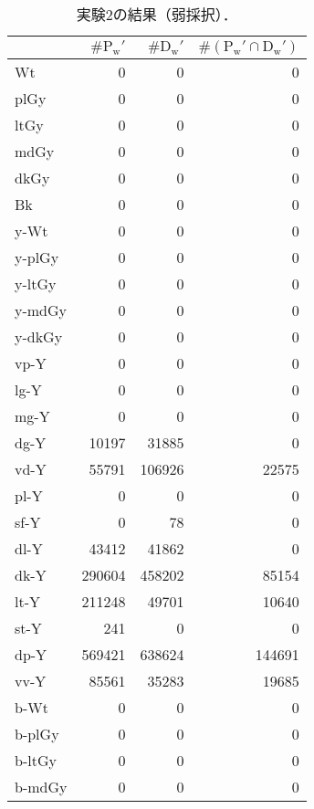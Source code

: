 \documentclass[uplatex,paper=a4,fontsize=4.0truemm,jafontsize=4.0truemm,head_space=30.0truemm,foot_space=30.0truemm,baselineskip=8.0truemm,line_length=40zw,gutter=25.0truemm,oneside,openany,fleqn,hanging_panctuation,open_bracket_pos=nibu_tentsuki,dvipdfmx,jis2004,book,titlepage]{jlreq}
\theoremstyle{mystyle}
\newcommand{\captiondot}[1]{\caption{#1．}}
\newcommand{\tableinput}[4]{\begin{table}[tbp]\centering\captiondot{#3}\label{tab:#4}\begin{tabular}{#1}#2\end{tabular}\end{table}}
\newcommand{\parentheses}[1]{\left(#1\right)}
\begin{document}
				\tableinput{l|rrr}{ & \(\#\textrm{P}_\textrm{w}'\) & \(\#\textrm{D}_\textrm{w}'\) & \(\#\parentheses{\textrm{P}_\textrm{w}'\cap\textrm{D}_\textrm{w}'}\) \\ \hline
					Wt & 0 & 0 & 0 \\
					plGy & 0 & 0 & 0 \\
					ltGy & 0 & 0 & 0 \\
					mdGy & 0 & 0 & 0 \\
					dkGy & 0 & 0 & 0 \\
					Bk & 0 & 0 & 0 \\
					y-Wt & 0 & 0 & 0 \\
					y-plGy & 0 & 0 & 0 \\
					y-ltGy & 0 & 0 & 0 \\
					y-mdGy & 0 & 0 & 0 \\
					y-dkGy & 0 & 0 & 0 \\
					vp-Y & 0 & 0 & 0 \\
					lg-Y & 0 & 0 & 0 \\
					mg-Y & 0 & 0 & 0 \\
					dg-Y & 10197 & 31885 & 0 \\
					vd-Y & 55791 & 106926 & 22575 \\
					pl-Y & 0 & 0 & 0 \\
					sf-Y & 0 & 78 & 0 \\
					dl-Y & 43412 & 41862 & 0 \\
					dk-Y & 290604 & 458202 & 85154 \\
					lt-Y & 211248 & 49701 & 10640 \\
					st-Y & 241 & 0 & 0 \\
					dp-Y & 569421 & 638624 & 144691 \\
					vv-Y & 85561 & 35283 & 19685 \\
					b-Wt & 0 & 0 & 0 \\
					b-plGy & 0 & 0 & 0 \\
					b-ltGy & 0 & 0 & 0 \\
					b-mdGy & 0 & 0 & 0}{実験2の結果（弱採択）}{result23}
\end{document}
